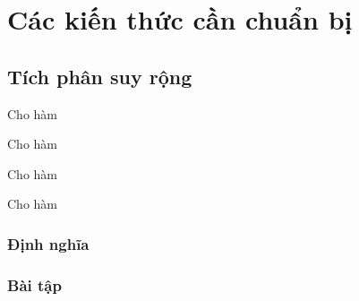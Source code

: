 \documentclass[12pt,a4paper]{report}
\makeatletter
\renewcommand\tableofcontents{%
  \null\hfill\textbf{\Large\contentsname}\hfill\null\par
  \@mkboth{\MakeUppercase\contentsname}{\MakeUppercase\contentsname}%
  \@starttoc{toc}%
}
\makeatother
\begin{document}
\tableofcontents
\chapter{Các kiến thức cần chuẩn bị}

\section{Tích phân suy rộng}
\begin{definetion}
  Cho hàm
\end{definetion}

\begin{definetion}
  Cho hàm
\end{definetion}

\begin{definetion}
  Cho hàm
\end{definetion}

\begin{definetion}
  Cho hàm
\end{definetion}
\subsection{Định nghĩa}
\subsection{Bài tập}
\end{document}
